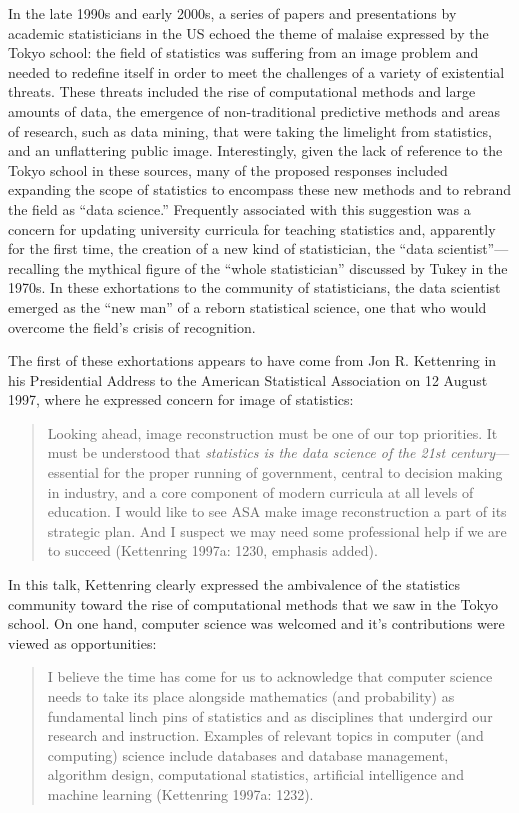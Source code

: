 \documentclass[
  letterpaper,
]{report}
\begin{document}
In the late 1990s and early 2000s, a series of papers and presentations
by academic statisticians in the US echoed the theme of malaise
expressed by the Tokyo school: the field of statistics was suffering
from an image problem and needed to redefine itself in order to meet the
challenges of a variety of existential threats. These threats included
the rise of computational methods and large amounts of data, the
emergence of non-traditional predictive methods and areas of research,
such as data mining, that were taking the limelight from statistics, and
an unflattering public image. Interestingly, given the lack of reference
to the Tokyo school in these sources, many of the proposed responses
included expanding the scope of statistics to encompass these new
methods and to rebrand the field as ``data science.'' Frequently
associated with this suggestion was a concern for updating university
curricula for teaching statistics and, apparently for the first time,
the creation of a new kind of statistician, the ``data
scientist''---recalling the mythical figure of the ``whole
statistician'' discussed by Tukey in the 1970s. In these exhortations to
the community of statisticians, the data scientist emerged as the ``new
man'' of a reborn statistical science, one that who would overcome the
field's crisis of recognition.

The first of these exhortations appears to have come from Jon R.
Kettenring in his Presidential Address to the American Statistical
Association on 12 August 1997, where he expressed concern for image of
statistics:

\begin{quote}
Looking ahead, image reconstruction must be one of our top priorities.
It must be understood that \emph{statistics is the data science of the
21st century}---essential for the proper running of government, central
to decision making in industry, and a core component of modern curricula
at all levels of education. I would like to see ASA make image
reconstruction a part of its strategic plan. And I suspect we may need
some professional help if we are to succeed (Kettenring 1997a: 1230,
emphasis added).
\end{quote}

In this talk, Kettenring clearly expressed the ambivalence of the
statistics community toward the rise of computational methods that we
saw in the Tokyo school. On one hand, computer science was welcomed and
it's contributions were viewed as opportunities:

\begin{quote}
I believe the time has come for us to acknowledge that computer science
needs to take its place alongside mathematics (and probability) as
fundamental linch pins of statistics and as disciplines that undergird
our research and instruction. Examples of relevant topics in computer
(and computing) science include databases and database management,
algorithm design, computational statistics, artificial intelligence and
machine learning (Kettenring 1997a: 1232).
\end{quote}
\end{document}
